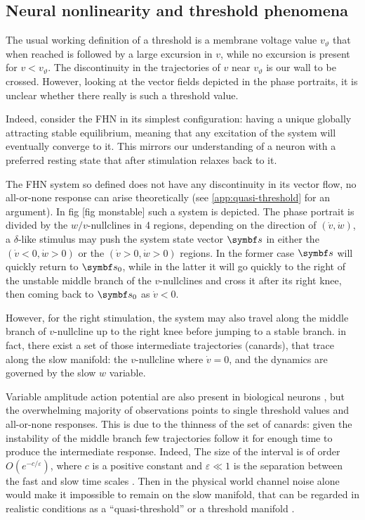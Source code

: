\subsection{Neural nonlinearity and threshold phenomena}
\label{sec:neural nonlin and th}
The usual working definition of a threshold is a membrane voltage value $v_{\vartheta}$ that when reached is followed by a large excursion in $v$, while no excursion is present for $v < v_{\vartheta}$. 
The discontinuity in the trajectories of $v$ near $v_{\vartheta}$ is our wall to be crossed. 
However, looking at the vector fields depicted in the phase portraits, it is unclear whether there really is such a threshold value.

Indeed, consider the FHN in its simplest configuration: having a unique globally attracting stable equilibrium, meaning that any excitation of the system will eventually converge to it. 
This mirrors our understanding of a neuron with a preferred resting state that after stimulation relaxes back to it.

The FHN system so defined does not have any discontinuity in its vector flow, no all-or-none response can arise theoretically (see \ref{app:quasi-threshold} for an argument). 
In fig [fig monstable] such a system is depicted. 
The phase portrait is divided by the $w/v$-nullclines in 4 regions, depending on the direction of $(\dot{v}, \dot{w})$, a $\delta$-like stimulus may push the system state vector $\vb{s}$ in either the $(\dot{v}<0, \dot{w}>0)$ or the $(\dot{v}>0, \dot{w}>0)$ regions. 
In the former case $\vb{s}$ will quickly return to $\vb{s}_0$, while in the latter it will go quickly to the right of the unstable middle branch of the $v$-nullclines and cross it after its right knee, then coming back to $\vb{s}_0$ as $\dot{v}<0$. 

However, for the right stimulation, the system may also travel along the middle branch of $v$-nullcline up to the right knee before jumping to a stable branch. 
in fact, there exist a set of those intermediate trajectories (canards), that trace along the slow manifold: the $v$-nullcline where $\dot{v} = 0$, and the dynamics are governed by the slow $w$ variable. 

Variable amplitude action potential are also present in biological neurons \cite{clayExcitabilitySquidGiant1998}, but the overwhelming majority of observations points to single threshold values and all-or-none responses. 
This is due to the thinness of the set of canards: given the instability of the middle branch few trajectories follow it for enough time to produce the intermediate response. 
Indeed, The size of the interval is of order $O(e^{-c/\varepsilon})$, where $c$ is a positive constant and $\varepsilon \ll 1$ is the separation between the fast and slow time scales \cite{guckenheimerNUMERICALCOMPUTATIONCANARDS2000}. 
Then in the physical world channel noise alone would make it impossible to remain on the slow manifold, that can be regarded in realistic conditions as a \enquote{quasi-threshold} or a threshold manifold \cite{fitzhughMathematicalModelsThreshold1955}. 

